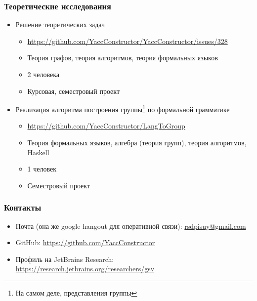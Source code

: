 \documentclass{beamer}
\begin{document}
\begin{frame}[fragile]
\transwipe[direction=90]
\frametitle{Теоретические исследования}
  \begin{itemize}
    \item Решение теоретических задач
    \begin{itemize}
       \item \footnotesize{\url{https://github.com/YaccConstructor/YaccConstructor/issues/328}}
       \item Теория графов, теория алгоритмов, теория формальных языков 
       \item 2 человека 
       \item Курсовая, семестровый проект
    \end{itemize}
    \item Реализация алгоритма построения группы\footnote{На самом деле, представления группы} по формальной грамматике
    \begin{itemize}
       \item \footnotesize{\url{https://github.com/YaccConstructor/LangToGroup}}
       \item Теория формальных языков, алгебра (теория групп), теория алгоритмов, Haskell 
       \item 1 человек
       \item Семестровый проект
    \end{itemize}
  \end{itemize}  
\end{frame}



\begin{frame}
\transwipe[direction=90]
\frametitle{Контакты}
\begin{itemize}
  \item Почта (она же google hangout для оперативной связи): \url{rsdpisuy@gmail.com}
  \item GitHub: \url{https://github.com/YaccConstructor}
  \item Профиль на JetBrains Research: \url{https://research.jetbrains.org/researchers/gsv}
\end{itemize}
\end{frame}
\end{document}

